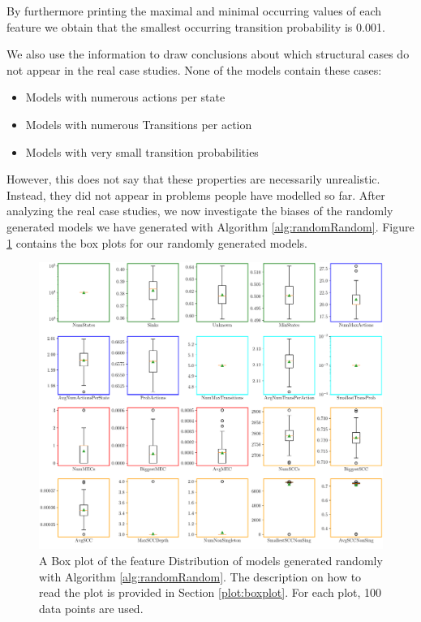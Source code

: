 By furthermore printing the maximal and minimal occurring values of each feature we obtain that the smallest occurring transition probability is 0.001.

We also use the information to draw conclusions about which structural cases do not appear in the real case studies. 
None of the models contain these cases:
\begin{itemize}
    \item Models with numerous actions per state
    \item Models with numerous Transitions per action
    \item Models with very small transition probabilities
\end{itemize}
\FloatBarrier
However, this does not say that these properties are necessarily unrealistic. Instead, they did not appear in problems people have modelled so far.
After analyzing the real case studies, we now investigate the biases of the randomly generated models we have generated with Algorithm \ref{alg:randomRandom}.
Figure \ref{fig:Random_FeatureDistribution} contains the box plots for our randomly generated models.
\begin{figure}[h!]
    \centering
    \includegraphics[width=1\textwidth]{figures/RandomRandom_FeatureDistribution.pdf}
    \caption[Feature Distribution of random models]{
        A Box plot of the feature Distribution of models generated randomly with Algorithm \ref{alg:randomRandom}. The description on how to read the plot is provided in Section \ref{plot:boxplot}.
        For each plot, 100 data points are used.
    }
    \label{fig:Random_FeatureDistribution}
\end{figure}
\FloatBarrier
 
